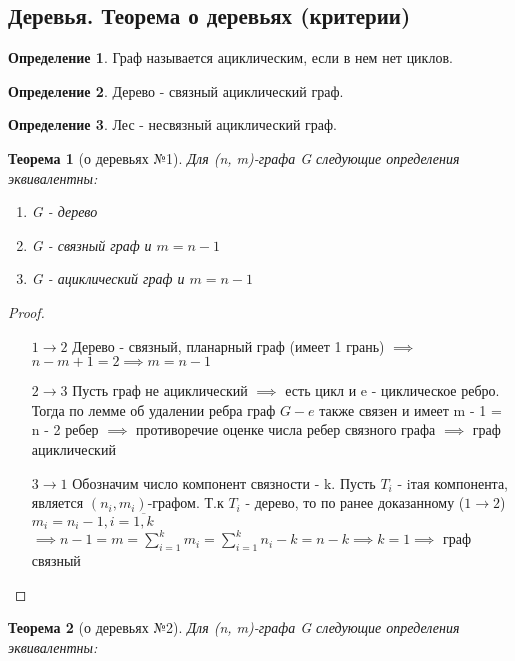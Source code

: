 \documentclass[a4paper]{article}
\newtheorem{theorem}{Теорема}[section]
\theoremstyle{definition}
\newtheorem*{definition}{Определение}
\theoremstyle{remark}
\begin{document}
\begin{multicols*}{2}
    \section{Деревья. Теорема о деревьях (критерии)}
    \begin{definition}
        Граф называется ациклическим, если в нем нет циклов.
    \end{definition}
    \begin{definition}
        Дерево - связный ациклический граф.
    \end{definition}
    \begin{definition}
        Лес - несвязный ациклический граф.
    \end{definition}
    \begin{theorem}[о деревьях №1]
        Для (n, m)-графа G следующие определения эквивалентны:
        \begin{enumerate}
            \item G - дерево
            \item G - связный граф и $m = n - 1$
            \item G - ациклический граф и $m = n - 1$
        \end{enumerate}
    \end{theorem}
    \begin{proof}
        \begin{itemize}
            \item[$1 \to 2$] Дерево - связный, планарный граф (имеет 1 грань) $\implies$ $n - m + 1 = 2\implies m = n - 1$
            \item[$2 \to 3$] Пусть граф не ациклический $\implies$ есть цикл и e - циклическое ребро.
            Тогда по лемме об удалении ребра граф $G - e$ также связен и имеет m - 1 = n - 2 ребер
            $\implies$ противоречие оценке числа ребер связного графа $\implies$ граф ациклический
            \item[$3 \to 1$] Обозначим число компонент связности - k. Пусть $T_i$ - iтая компонента,
            является $(n_i, m_i)$-графом. Т.к $T_i$ - дерево, то по ранее доказанному ($1 \to 2$) $m_i = n_i - 1, i = \overline{1, k}$
            $\implies n - 1 = m = \sum_{i = 1}^k m_i = \sum_{i = 1}^k n_i - k = n - k \implies k = 1\implies$ граф связный 
        \end{itemize}
    \end{proof}
    \begin{theorem}[о деревьях №2]
        Для (n, m)-графа G следующие определения эквивалентны:
        \begin{enumerate}

\end{enumerate}
\end{theorem}
\end{multicols*}
\end{document}
